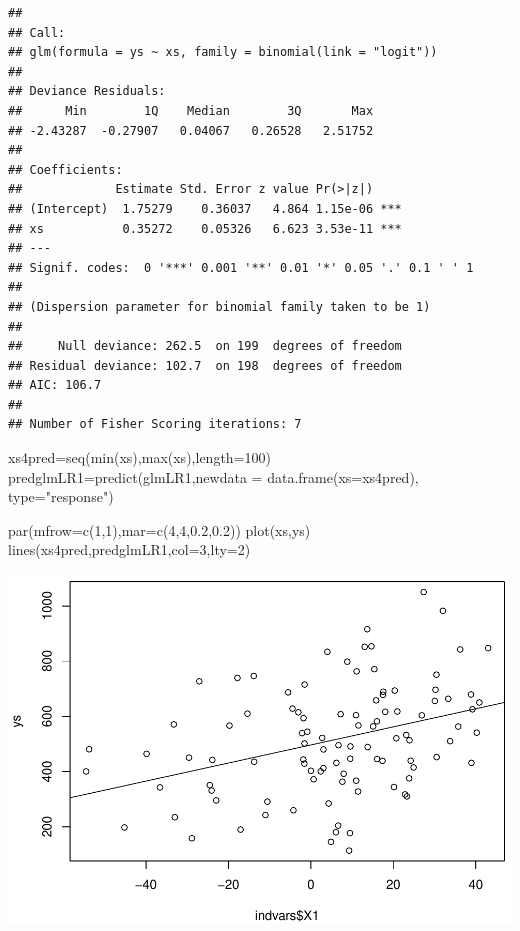 \documentclass[
]{book}
\newenvironment{Shaded}{\begin{snugshade}}{\end{snugshade}}
\newcommand{\AttributeTok}[1]{\textcolor[rgb]{0.77,0.63,0.00}{#1}}
\newcommand{\DecValTok}[1]{\textcolor[rgb]{0.00,0.00,0.81}{#1}}
\newcommand{\FloatTok}[1]{\textcolor[rgb]{0.00,0.00,0.81}{#1}}
\newcommand{\FunctionTok}[1]{\textcolor[rgb]{0.00,0.00,0.00}{#1}}
\newcommand{\NormalTok}[1]{#1}
\newcommand{\OtherTok}[1]{\textcolor[rgb]{0.56,0.35,0.01}{#1}}
\newcommand{\StringTok}[1]{\textcolor[rgb]{0.31,0.60,0.02}{#1}}
\begin{document}
\begin{verbatim}
## 
## Call:
## glm(formula = ys ~ xs, family = binomial(link = "logit"))
## 
## Deviance Residuals: 
##      Min        1Q    Median        3Q       Max  
## -2.43287  -0.27907   0.04067   0.26528   2.51752  
## 
## Coefficients:
##             Estimate Std. Error z value Pr(>|z|)    
## (Intercept)  1.75279    0.36037   4.864 1.15e-06 ***
## xs           0.35272    0.05326   6.623 3.53e-11 ***
## ---
## Signif. codes:  0 '***' 0.001 '**' 0.01 '*' 0.05 '.' 0.1 ' ' 1
## 
## (Dispersion parameter for binomial family taken to be 1)
## 
##     Null deviance: 262.5  on 199  degrees of freedom
## Residual deviance: 102.7  on 198  degrees of freedom
## AIC: 106.7
## 
## Number of Fisher Scoring iterations: 7
\end{verbatim}

\begin{Shaded}
\begin{Highlighting}[]
\NormalTok{xs4pred}\OtherTok{=}\FunctionTok{seq}\NormalTok{(}\FunctionTok{min}\NormalTok{(xs),}\FunctionTok{max}\NormalTok{(xs),}\AttributeTok{length=}\DecValTok{100}\NormalTok{)}
\NormalTok{predglmLR1}\OtherTok{=}\FunctionTok{predict}\NormalTok{(glmLR1,}\AttributeTok{newdata =} \FunctionTok{data.frame}\NormalTok{(}\AttributeTok{xs=}\NormalTok{xs4pred),}
\AttributeTok{type=}\StringTok{"response"}\NormalTok{)}

\FunctionTok{par}\NormalTok{(}\AttributeTok{mfrow=}\FunctionTok{c}\NormalTok{(}\DecValTok{1}\NormalTok{,}\DecValTok{1}\NormalTok{),}\AttributeTok{mar=}\FunctionTok{c}\NormalTok{(}\DecValTok{4}\NormalTok{,}\DecValTok{4}\NormalTok{,}\FloatTok{0.2}\NormalTok{,}\FloatTok{0.2}\NormalTok{))}
\FunctionTok{plot}\NormalTok{(xs,ys)}
\FunctionTok{lines}\NormalTok{(xs4pred,predglmLR1,}\AttributeTok{col=}\DecValTok{3}\NormalTok{,}\AttributeTok{lty=}\DecValTok{2}\NormalTok{)}
\end{Highlighting}
\end{Shaded}

\includegraphics{ECOMODbook_files/figure-latex/unnamed-chunk-14-1.pdf}
\end{document}
